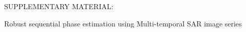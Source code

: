 \appendices

\normalsize

\onecolumn
\clearpage %
\begin{center}
    \Large{SUPPLEMENTARY MATERIAL: }
    
    \Large{Robust sequential phase estimation using Multi-temporal SAR image series}
\end{center}

